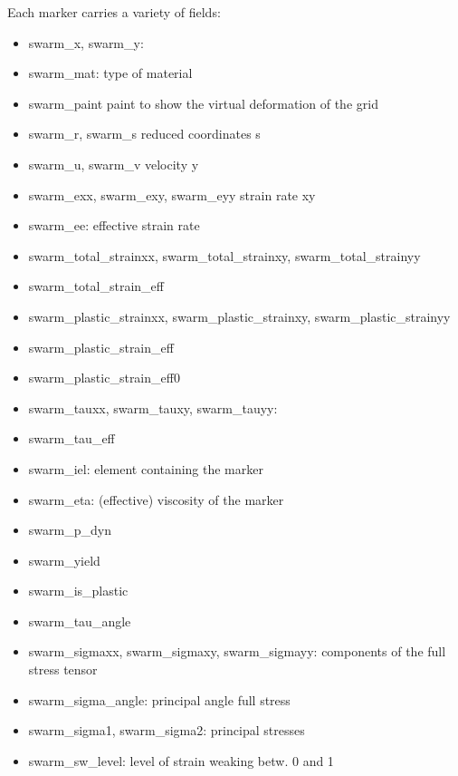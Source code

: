 \documentclass[a4paper]{article}
\newcommand{\python}{\color{darkgray} \sffamily }
\begin{document}
Each marker carries a variety of fields:
\begin{itemize}
\item {\python swarm\_x},{\python swarm\_y}:
\item {\python swarm\_mat}:  type of material 
\item {\python swarm\_paint}     paint to show the virtual deformation of the grid
\item {\python swarm\_r},{\python swarm\_s}         reduced coordinates s
\item {\python swarm\_u},{\python swarm\_v}         velocity y
\item {\python swarm\_exx},{\python swarm\_exy},{\python swarm\_eyy}  strain rate xy
\item {\python swarm\_ee}:        effective strain rate
\item {\python swarm\_total\_strainxx}, {\python swarm\_total\_strainxy}, {\python swarm\_total\_strainyy}
\item {\python swarm\_total\_strain\_eff}
\item {\python swarm\_plastic\_strainxx}, {\python swarm\_plastic\_strainxy}, {\python swarm\_plastic\_strainyy}
\item {\python swarm\_plastic\_strain\_eff}
\item {\python swarm\_plastic\_strain\_eff0}
\item {\python swarm\_tauxx}, {\python swarm\_tauxy}, {\python swarm\_tauyy}:
\item {\python swarm\_tau\_eff}
\item {\python swarm\_iel}: element containing the marker
\item {\python swarm\_eta}: (effective) viscosity of the marker
\item {\python swarm\_p\_dyn}
\item {\python swarm\_yield}
\item {\python swarm\_is\_plastic}
\item {\python swarm\_tau\_angle}
\item {\python swarm\_sigmaxx}, {\python swarm\_sigmaxy}, {\python swarm\_sigmayy}: components of the 
full stress tensor
\item {\python swarm\_sigma\_angle}: principal angle full stress
\item {\python swarm\_sigma1}, {\python swarm\_sigma2}: principal stresses
\item {\python swarm\_sw\_level}: level of strain weaking betw. 0 and 1
\end{itemize}
\end{document}

